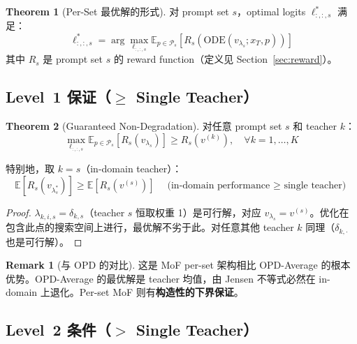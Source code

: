 \documentclass[11pt,a4paper]{article}
\newcommand{\E}{\mathbb{E}}
\newcommand{\reward}{R}
\theoremstyle{definition}
\newtheorem{remark}{Remark}
\newtheorem{theorem}{Theorem}
\begin{document}
\begin{theorem}[Per-Set 最优解的形式]
\label{thm:optimal}
对 prompt set $s$，optimal logits $\ell^*_{:,:,s}$ 满足：
\begin{equation}
\ell^*_{:,:,s} = \arg\max_{\ell_{:,:,s}} \E_{p \in \mathcal{P}_s}\left[\reward_s\!\left(\mathrm{ODE}(v_{\lambda_s}; x_T, p)\right)\right]
\label{eq:per_set_optimal}
\end{equation}
其中 $\reward_s$ 是 prompt set $s$ 的 reward function（定义见 Section~\ref{sec:reward}）。
\end{theorem}

\subsection{Level~1 保证（$\geq$ Single Teacher）}

\begin{theorem}[Guaranteed Non-Degradation]
\label{thm:non_degrade}
对任意 prompt set $s$ 和 teacher $k$：
\begin{equation}
\max_{\ell_{:,:,s}} \E_{p \in \mathcal{P}_s}\left[\reward_s(v_{\lambda_s})\right] \geq \reward_s(v^{(k)}), \quad \forall k = 1,\ldots,K
\end{equation}

特别地，取 $k = s$（in-domain teacher）：
\begin{equation}
\boxed{
\E[\reward_s(v_{\lambda^*_s})] \geq \E[\reward_s(v^{(s)})] \quad\text{(in-domain performance $\geq$ single teacher)}
}
\end{equation}
\end{theorem}

\begin{proof}
$\lambda_{k,i,s} = \delta_{k,s}$（teacher $s$ 恒取权重 1）是可行解，对应 $v_{\lambda_s} = v^{(s)}$。优化在包含此点的搜索空间上进行，最优解不劣于此。对任意其他 teacher $k$ 同理（$\delta_{k,\cdot}$ 也是可行解）。
\end{proof}

\begin{remark}[与 OPD 的对比]
这是 MoF per-set 架构相比 OPD-Average 的根本优势。OPD-Average 的最优解是 teacher 均值，由 Jensen 不等式必然在 in-domain 上退化。Per-set MoF 则有\textbf{构造性的下界保证}。
\end{remark}

\subsection{Level~2 条件（$>$ Single Teacher）}
\end{document}
